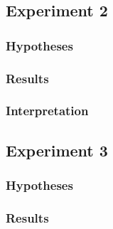 \documentclass[11pt]{article}
\begin{document}
\subsubsection{}

\subsection{Experiment 2}

\subsubsection{Hypotheses}


\subsubsection{Results}


\subsubsection{Interpretation}


\subsubsection{}

\subsection{Experiment 3}

\subsubsection{Hypotheses}


\subsubsection{Results}
\end{document}
